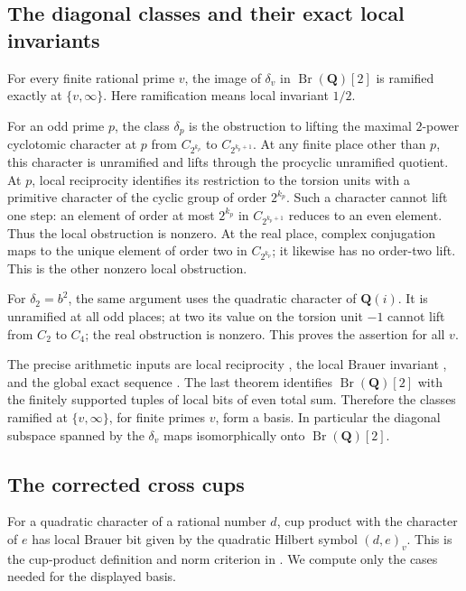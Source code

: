 \subsection{The diagonal classes and their exact local invariants}

For every finite rational prime \(v\), the image of \(\delta_v\)
in \(\operatorname{Br}(\mathbf Q)[2]\) is ramified exactly at
\(\{v,\infty\}\). Here ramification means local invariant \(1/2\).

For an odd prime \(p\), the class \(\delta_p\) is the obstruction
to lifting the maximal \(2\)-power cyclotomic character at \(p\)
from \(C_{2^{k_p}}\) to \(C_{2^{k_p+1}}\).
At any finite place other than \(p\), this character is
unramified and lifts through the procyclic unramified quotient.
At \(p\), local reciprocity identifies its restriction to the
torsion units with a primitive character of the cyclic group
of order \(2^{k_p}\). Such a character cannot lift one step:
an element of order at most \(2^{k_p}\) in
\(C_{2^{k_p+1}}\) reduces to an even element.
Thus the local obstruction is nonzero.
At the real place, complex conjugation maps to the unique
element of order two in \(C_{2^{k_p}}\); it likewise has no
order-two lift. This is the other nonzero local obstruction.

For \(\delta_2=b^2\), the same argument uses the quadratic
character of \(\mathbf Q(i)\). It is unramified at all odd
places; at two its value on the torsion unit \(-1\) cannot
lift from \(C_2\) to \(C_4\); the real obstruction is nonzero.
This proves the assertion for all \(v\).

The precise arithmetic inputs are local reciprocity
\cite[I, Theorem~1.1, p.~20]{MilneCFT}, the local
Brauer invariant \cite[III, Theorem~2.1, p.~103]{MilneCFT},
and the global exact sequence
\cite[VIII, Theorem~4.2, p.~241]{MilneCFT}.
The last theorem identifies \(\operatorname{Br}(\mathbf Q)[2]\)
with the finitely supported tuples of local bits of even total sum.
Therefore the classes ramified at \(\{v,\infty\}\), for finite
primes \(v\), form a basis. In particular the diagonal
subspace spanned by the \(\delta_v\) maps isomorphically onto
\(\operatorname{Br}(\mathbf Q)[2]\).

\subsection{The corrected cross cups}

For a quadratic character of a rational number \(d\), cup
product with the character of \(e\) has local Brauer bit
given by the quadratic Hilbert symbol \((d,e)_v\).
This is the cup-product definition and norm criterion in
\cite[III, \S4, pp.~112--115, especially Theorem~4.4]{MilneCFT}.
We compute only the cases needed for the displayed basis.

